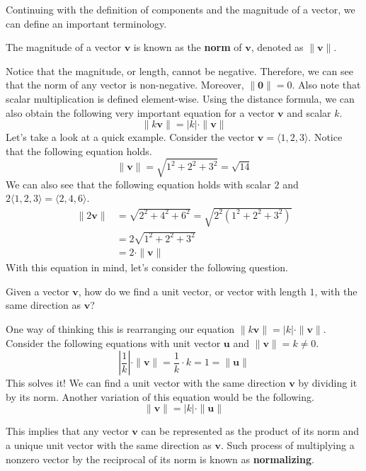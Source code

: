 \documentclass[../../../main.tex]{subfiles}
\begin{document}
Continuing with the definition of components and the magnitude of a
vector, we can define an important terminology.

\begin{definition}{}{}
The magnitude of a vector $\mathbf{v}$ is known as the \textbf{norm}
of $\mathbf{v}$, denoted as $\| \mathbf{v} \|$.
\end{definition}

Notice that the magnitude, or length, cannot be negative. Therefore,
we can see that the norm of any vector is non-negative. Moreover,
$\| \mathbf{0} \| = 0$. Also note that scalar multiplication is
defined element-wise. Using the distance formula, we can also obtain
the following very important equation for a vector $\mathbf{v}$ and
scalar $k$.
\[
\| k \mathbf{v} \| = |k| \cdot \| \mathbf{v} \|
\]
Let's take a look at a quick example. Consider the vector
$\mathbf{v} = \langle 1, 2, 3 \rangle$. Notice that the following
equation holds.
\[
\| \mathbf{v} \|
= \sqrt{1^2 + 2^2 + 3^2}
= \sqrt{14}
\]
We can also see that the following equation holds with scalar $2$
and $2 \langle 1, 2, 3 \rangle = \langle 2, 4, 6 \rangle$.
\begin{align*}
    \| 2 \mathbf{v} \|
    &= \sqrt{2^2 + 4^2 + 6^2}
    = \sqrt{2^2 (1^2 + 2^2 + 3^2)} \\
    &= 2 \sqrt{1^2 + 2^2 + 3^2} \\
    &= 2 \cdot \| \mathbf{v} \|
\end{align*}
With this equation in mind, let's consider the following question.

\begin{important}
Given a vector $\mathbf{v}$, how do we find a unit vector, or
vector with length $1$, with the same direction as $\mathbf{v}$?
\end{important}

One way of thinking this is rearranging our equation
$\| k \mathbf{v} \| = |k| \cdot \| \mathbf{v} \|$. Consider the
following equations with unit vector $\mathbf{u}$ and
$\| \mathbf{v} \| = k \neq 0$.
\[
\left| \frac{1}{k} \right| \cdot \| \mathbf{v} \|
= \frac{1}{k} \cdot k
= 1
= \| \mathbf{u} \|
\]
This solves it! We can find a unit vector with the same direction
$\mathbf{v}$ by dividing it by its norm. Another variation of this
equation would be the following.
\[
\| \mathbf{v} \| = |k| \cdot \| \mathbf{u} \|
\]
\begin{important}
This implies that any vector $\mathbf{v}$ can be represented as
the product of its norm and a unique unit vector with the same
direction as $\mathbf{v}$. Such process of multiplying a nonzero
vector by the reciprocal of its norm is known as \textbf{normalizing}.
\end{important}
\end{document}
